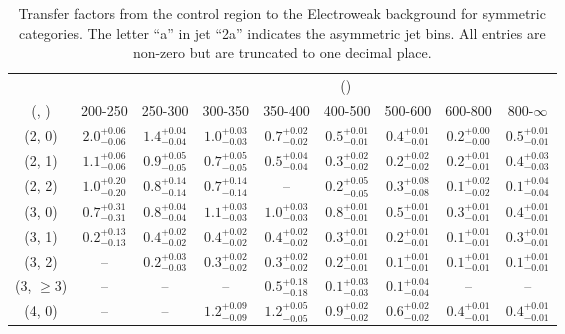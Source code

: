 \begin{table}[h!]
\tiny
\centering
\caption{Transfer factors from the \mj control region to the Electroweak background for symmetric categories. The letter ``a'' in jet \eg ``2a''  indicates the asymmetric jet bins. All entries are non-zero but are truncated to one decimal place.\label{tab:tf_mu_total_sym}}
\begin{tabular}
{ccccccccc}
	\hline\hline
&	& \multicolumn{8}{c}{\scalht (\gev)} \\ 
	 (\njet,  \nb) & 200-250 & 250-300 & 300-350 & 350-400 & 400-500 & 500-600 & 600-800 & 800-$\infty$ \\ [0.8ex] 
\hline
	(2, 0) & $2.0^{+ 0.06 }_{- 0.06 }$ & $1.4^{+ 0.04 }_{- 0.04 }$ & $1.0^{+ 0.03 }_{- 0.03 }$ & $0.7^{+ 0.02 }_{- 0.02 }$ & $0.5^{+ 0.01 }_{- 0.01 }$ & $0.4^{+ 0.01 }_{- 0.01 }$ & $0.2^{+ 0.00 }_{- 0.00 }$ & $0.5^{+ 0.01 }_{- 0.01 }$ \\[0.5ex] 
	(2, 1) & $1.1^{+ 0.06 }_{- 0.06 }$ & $0.9^{+ 0.05 }_{- 0.05 }$ & $0.7^{+ 0.05 }_{- 0.05 }$ & $0.5^{+ 0.04 }_{- 0.04 }$ & $0.3^{+ 0.02 }_{- 0.02 }$ & $0.2^{+ 0.02 }_{- 0.02 }$ & $0.2^{+ 0.01 }_{- 0.01 }$ & $0.4^{+ 0.03 }_{- 0.03 }$ \\[0.5ex] 
	(2, 2) & $1.0^{+ 0.20 }_{- 0.20 }$ & $0.8^{+ 0.14 }_{- 0.14 }$ & $0.7^{+ 0.14 }_{- 0.14 }$ & -- & $0.2^{+ 0.05 }_{- 0.05 }$ & $0.3^{+ 0.08 }_{- 0.08 }$ & $0.1^{+ 0.02 }_{- 0.02 }$ & $0.1^{+ 0.04 }_{- 0.04 }$ \\[0.5ex] 
	(3, 0) & $0.7^{+ 0.31 }_{- 0.31 }$ & $0.8^{+ 0.04 }_{- 0.04 }$ & $1.1^{+ 0.03 }_{- 0.03 }$ & $1.0^{+ 0.03 }_{- 0.03 }$ & $0.8^{+ 0.01 }_{- 0.01 }$ & $0.5^{+ 0.01 }_{- 0.01 }$ & $0.3^{+ 0.01 }_{- 0.01 }$ & $0.4^{+ 0.01 }_{- 0.01 }$ \\[0.5ex] 
	(3, 1) & $0.2^{+ 0.13 }_{- 0.13 }$ & $0.4^{+ 0.02 }_{- 0.02 }$ & $0.4^{+ 0.02 }_{- 0.02 }$ & $0.4^{+ 0.02 }_{- 0.02 }$ & $0.3^{+ 0.01 }_{- 0.01 }$ & $0.2^{+ 0.01 }_{- 0.01 }$ & $0.1^{+ 0.01 }_{- 0.01 }$ & $0.3^{+ 0.01 }_{- 0.01 }$ \\[0.5ex] 
	(3, 2) & -- & $0.2^{+ 0.03 }_{- 0.03 }$ & $0.3^{+ 0.02 }_{- 0.02 }$ & $0.3^{+ 0.02 }_{- 0.02 }$ & $0.2^{+ 0.01 }_{- 0.01 }$ & $0.1^{+ 0.01 }_{- 0.01 }$ & $0.1^{+ 0.01 }_{- 0.01 }$ & $0.1^{+ 0.01 }_{- 0.01 }$ \\[0.5ex] 
	(3, $\ge3$) & -- & -- & -- & $0.5^{+ 0.18 }_{- 0.18 }$ & $0.1^{+ 0.03 }_{- 0.03 }$ & $0.1^{+ 0.04 }_{- 0.04 }$ & -- & -- \\[0.5ex] 
	(4, 0) & -- & -- & $1.2^{+ 0.09 }_{- 0.09 }$ & $1.2^{+ 0.05 }_{- 0.05 }$ & $0.9^{+ 0.02 }_{- 0.02 }$ & $0.6^{+ 0.02 }_{- 0.02 }$ & $0.4^{+ 0.01 }_{- 0.01 }$ & $0.4^{+ 0.01 }_{- 0.01 }$ \\[0.5ex] 

\end{tabular}
\end{table}
